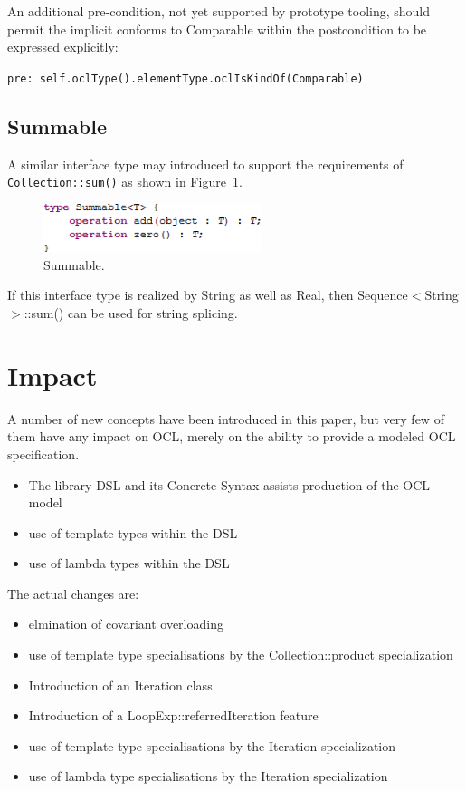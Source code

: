 \documentclass{eceasst}
\begin{document}
An additional pre-condition, not yet supported by prototype tooling, should permit the implicit conforms to Comparable within the postcondition to be expressed explicitly:

\verb|pre: self.oclType().elementType.oclIsKindOf(Comparable)|

\subsection{Summable}

A similar interface type may introduced to support the requirements of \verb|Collection::sum()| as shown in Figure~\ref{fig:Summable}.

\begin{figure}
  \begin{center}
    \includegraphics[width=2.5in]{Summable.png}
  \end{center}
  \caption{Summable.}
  \label{fig:Summable}
\end{figure}

If this interface type is realized by String as well as Real, then Sequence$<$String$>$::sum() can be used for string splicing.

\section{Impact}

A number of new concepts have been introduced in this paper, but very few of them have any impact on OCL, merely on the ability to provide a modeled OCL specification.

\begin{itemize}
\item The library DSL and its Concrete Syntax assists production of the OCL model 
\item use of template types within the DSL
\item use of lambda types within the DSL
\end{itemize}

The actual changes are:

\begin{itemize}
\item elmination of covariant overloading
\item use of template type specialisations by the Collection::product specialization
\item Introduction of an Iteration class
\item Introduction of a LoopExp::referredIteration feature 
\item use of template type specialisations by the Iteration specialization
\item use of lambda type specialisations by the Iteration specialization
\end{itemize}
\end{document}
